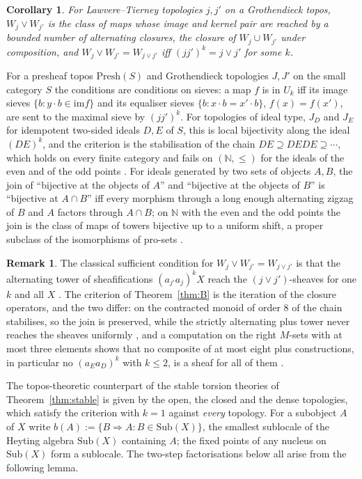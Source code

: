 \documentclass[11pt]{amsart}
\newtheorem{cor}[thm]{Corollary}
\theoremstyle{definition}
\newtheorem{rem}[thm]{Remark}
\newcommand{\Presh}{\mathrm{Presh}}
\newcommand{\im}{\mathrm{im}}
\newcommand{\Sub}{\mathrm{Sub}}
\begin{document}
\begin{cor}\label{cor:topos}
For Lawvere--Tierney topologies $j,j'$ on a Grothendieck topos,
$W_j\vee W_{j'}$ is the class of maps whose image and kernel pair are reached
by a bounded number of alternating closures, the closure of $W_j\cup W_{j'}$
under composition, and $W_j\vee W_{j'}=W_{j\vee j'}$ iff $(jj')^k=j\vee j'$
for some $k$.
\end{cor}

For a presheaf topos $\Presh(S)$ and Grothendieck topologies $J,J'$ on the
small category $S$ the conditions are conditions on sieves: a map $f$ is in
$U_k$ iff its image sieves $\{b:y\cdot b\in\im f\}$ and its equaliser sieves
$\{b:x\cdot b=x'\cdot b\}$, $f(x)=f(x')$, are sent to the maximal sieve by
$(jj')^k$. For topologies of ideal type, $J_D$ and $J_E$ for idempotent
two-sided ideals $D,E$ of $S$, this is local bijectivity along the ideal
$(DE)^k$, and the criterion is the stabilisation of the chain $DE\supseteq
DEDE\supseteq\cdots$, which holds on every finite category and fails on
$(\mathbb N,\le)$ for the ideals of the even and of the odd points
\cite[\S5]{Stabjoin}. For ideals generated by two sets of objects $A,B$,
the join of ``bijective at the objects of $A$'' and ``bijective at the
objects of $B$'' is ``bijective at $A\cap B$'' iff every morphism through
a long enough alternating zigzag of $B$ and $A$ factors through $A\cap B$;
on $\mathbb N$ with the even and the odd points the join is the class of maps
of towers bijective up to a uniform shift, a proper subclass of the
isomorphisms of pro-sets \cite[\S6]{Stabjoin}.

\begin{rem}\label{rem:tower}
The classical sufficient condition for $W_j\vee W_{j'}=W_{j\vee j'}$ is that
the alternating tower of sheafifications $(a_{j'}a_j)^kX$ reach the
$(j\vee j')$-sheaves for one $k$ and all $X$ \cite[Thm.~4.1]{Postnikov}. The
criterion of Theorem~\ref{thm:B} is the iteration of the closure operators,
and the two differ: on the contracted monoid of order $8$ of
\cite[\S7]{Finitejoin} the chain stabilises, so the join is preserved, while
the strictly alternating plus tower never reaches the sheaves uniformly
\cite[Prop.~7.1]{Finitejoin}, and a computation on the right $M$-sets with
at most three elements shows that no composite of at most eight plus
constructions, in particular no $(a_Ea_D)^k$ with $k\le2$, is a sheaf for all
of them \cite[\S8]{Stabjoin}.
\end{rem}

The topos-theoretic counterpart of the stable torsion theories of
Theorem~\ref{thm:stable} is given by the open, the closed and the dense
topologies, which satisfy the criterion with $k=1$ against \emph{every}
topology. For a subobject $A$ of $X$ write $b(A):=\{B\Rightarrow A:B\in
\Sub(X)\}$, the smallest sublocale of the Heyting algebra $\Sub(X)$
containing $A$; the fixed points of any nucleus on $\Sub(X)$ form a
sublocale. The two-step factorisations below all arise from the following
lemma.
\end{document}
